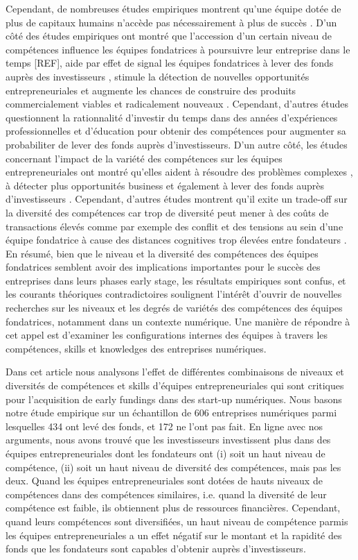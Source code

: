 \documentclass[12pt]{article}
\begin{document}
Cependant, de nombreuses études empiriques montrent qu'une équipe dotée de plus de capitaux humains n'accède pas nécessairement à plus de succès \citep{pierce2013too}. D'un côté des études empiriques ont montré que l'accession d'un certain niveau de compétences influence les équipes fondatrices à poursuivre leur entreprise dans le temps [REF], aide par effet de signal les équipes fondatrices à lever des fonds auprès des investisseurs \citep{beckman2007early}, stimule la détection de nouvelles opportunités entrepreneuriales \citep{shane2000promise} et augmente les chances de construire des produits commercialement viables et radicalement nouveaux \citep{marvel2007technology}. Cependant, d'autres études questionnent la rationnalité d'investir du temps dans des années d'expériences professionnelles et d'éducation pour obtenir des compétences pour augmenter sa probabiliter de lever des fonds auprès d'investisseurs. D'un autre côté, les études concernant l'impact de la variété des compétences sur les équipes entrepreneuriales ont montré qu'elles aident à résoudre des problèmes complexes \citep{hong2001problem}, à détecter plus opportunités business \citep{shane2000prior} et également à lever des fonds auprès d'investisseurs \citep{ko2018signaling}. Cependant, d'autres études montrent qu'il exite un trade-off sur la diversité des compétences car trop de diversité peut mener à des coûts de transactions élevés comme par exemple des conflit et des tensions au sein d'une équipe fondatrice à cause des distances cognitives trop élevées entre fondateurs \citep{nooteboom2007optimal}. En résumé, bien que le niveau et la diversité des compétences des équipes fondatrices semblent avoir des implications importantes pour le succès des entreprises dans leurs phases early stage, les résultats empiriques sont confus, et les courants théoriques contradictoires soulignent l'intérêt d'ouvrir de nouvelles recherches sur les niveaux et les degrés de variétés des compétences des équipes fondatrices, notamment dans un contexte numérique. Une manière de répondre à cet appel est d'examiner les configurations internes des équipes à travers les compétences, skills et knowledges des entreprises numériques.

Dans cet article nous analysons l'effet de différentes combinaisons de niveaux et diversités de compétences et skills d'équipes entrepreneuriales qui sont critiques pour l'acquisition de early fundings dans des start-up numériques. Nous basons notre étude empirique sur un échantillon de 606 entreprises numériques parmi lesquelles 434 ont levé des fonds, et 172 ne l'ont pas fait. En ligne avec nos arguments, nous avons trouvé que les investisseurs investissent plus dans des équipes entrepreneuriales dont les fondateurs ont (i) soit un haut niveau de compétence, (ii) soit un haut niveau de diversité des compétences, mais pas les deux. Quand les équipes entrepreneuriales sont dotées de hauts niveaux de compétences dans des compétences similaires, i.e. quand la diversité de leur compétence est faible, ils obtiennent plus de ressources financières. Cependant, quand leurs compétences sont diversifiées, un haut niveau de compétence parmis les équipes entrepreneuriales a un effet négatif sur le montant et la rapidité des fonds que les fondateurs sont capables d'obtenir auprès d'investisseurs.
\end{document}
